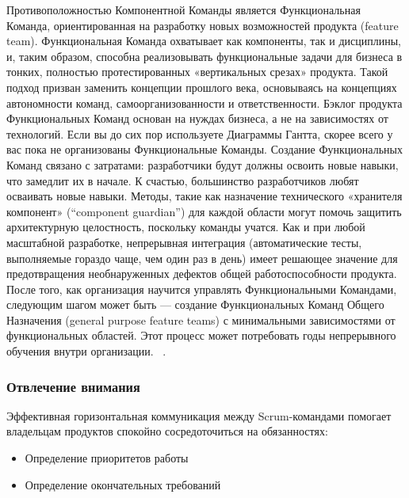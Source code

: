 \documentclass{../industrial-development}
\begin{document}
\lecturenotes
Противоположностью Компонентной Команды является Функциональная Команда, ориентированная на разработку новых возможностей продукта (feature team). Функциональная Команда охватывает как компоненты, так и дисциплины, и, таким образом, способна реализовывать функциональные задачи для бизнеса в тонких, полностью протестированных «вертикальных срезах» продукта. Такой подход призван заменить концепции прошлого века, основываясь на концепциях автономности команд, самоорганизованности и ответственности. Бэклог продукта Функциональных Команд основан на нуждах бизнеса, а не на зависимостях от технологий. Если вы до сих пор используете Диаграммы Гантта, скорее всего у вас пока не организованы Функциональные Команды. Создание Функциональных Команд связано с затратами: разработчики будут должны освоить новые навыки, что замедлит их в начале. К счастью, большинство разработчиков любят осваивать новые навыки. Методы, такие как назначение технического «хранителя компонент» (“component guardian”) для каждой области могут помочь защитить архитектурную целостность, поскольку команды учатся. Как и при любой масштабной разработке, непрерывная интеграция (автоматические тесты, выполняемые гораздо чаще, чем один раз в день) имеет решающее значение для предотвращения необнаруженных дефектов общей работоспособности продукта. После того, как организация научится управлять Функциональными Командами, следующим шагом может быть — создание Функциональных Команд Общего Назначения (general purpose feature teams) с минимальными зависимостями от функциональных областей. Этот процесс может потребовать годы непрерывного обучения внутри организации. 
~\cite{Fowler}.


\begin{frame} \frametitle{Отвлечение внимания}
		Эффективная горизонтальная коммуникация между Scrum-командами помогает владельцам продуктов спокойно сосредоточиться на обязанностях:
	\begin{itemize}
		\item Определение приоритетов работы 
		\item Определение окончательных требований
\end{itemize}
\end{frame}
\end{document}
